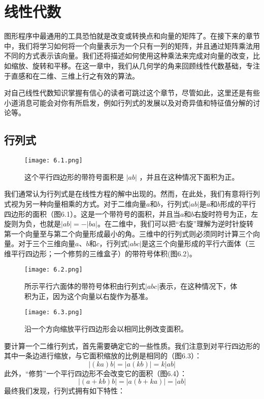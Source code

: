 \documentclass[lang=cn,12pt]{elegantbook}
\begin{document}
\chapter{线性代数}

图形程序中最通用的工具恐怕就是改变或转换点和向量的矩阵了。在接下来的章节中，我们将学习如何将一个向量表示为一个只有一列的矩阵，并且通过矩阵乘法用不同的方式表示该向量。我们还将描述如何使用这种乘法来完成对向量的改变，比如缩放、旋转和平移。在这一章中，我们从几何学的角来回顾线性代数基础，专注于直感和在二维、三维上行之有效的算法。

对自己线性代数知识掌握有信心的读者可跳过这个章节，尽管如此，这里还是有些小道消息可能会对你有所启发，例如行列式的发展以及对奇异值和特征值分解的讨论等。

\section{行列式}

\begin{figure}[htbp]
  \centering
  \texttt{[image: 6.1.png]}
  \caption{这个平行四边形的带符号面积是 $|ab|$ ，并且在这种情况下面积为正。}
\end{figure}

我们通常认为行列式是在线性方程的解中出现的。然而，在此处，我们有意将行列式视为另一种向量相乘的方式。对于二维向量$a$和$b$，行列式$|ab|$是$a$和$b$形成的平行四边形的面积（图6.1）。这是一个带符号的面积，并且当$a$和$b$右旋时符号为正，左旋则为负，也就是$|ab| = -|ba|$。在二维中，我们可以把“右旋”理解为逆时针旋转第一个向量至与第二个向量形成最小的角。三维中的行列式则必须同时计算三个向量。对于三个三维向量$a$、$b$和$c$，行列式$|abc|$是这三个向量形成的平行六面体（三维平行四边形；一个修剪的三维盒子）的带符号体积(图6.2)。

\begin{figure}[htbp]
  \centering
  \texttt{[image: 6.2.png]}
  \caption{所示平行六面体的带符号体积由行列式$|abc|$表示，在这种情况下，体积为正，因为这个向量以右旋作为基准。}
\end{figure}

\begin{figure}[htbp]
  \centering
  \texttt{[image: 6.3.png]}
  \caption{沿一个方向缩放平行四边形会以相同比例改变面积。}
\end{figure}

要计算一个二维行列式，首先需要确定它的一些性质。我们注意到对平行四边形的其中一条边进行缩放，与它面积缩放的比例是相同的（图6.3）：$$|(ka)b| =  |a(kb)| = k|ab|$$此外，“修剪”一个平行四边形不会改变它的面积（图6.4）：$$|(a+kb)b| =  |a(b+ka)| = |ab|$$最终我们发现，行列式拥有如下特性：
\end{document}
